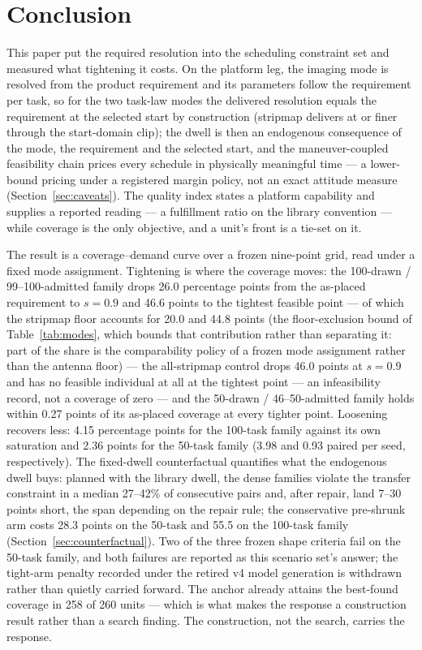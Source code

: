 \documentclass[preprint,authoryear]{elsarticle}
\begin{document}
\section{Conclusion}\label{sec:conclusion}

This paper put the required resolution into the scheduling constraint set and measured what tightening it costs. On the platform leg, the imaging mode is resolved from the product requirement and its parameters follow the requirement per task, so for the two task-law modes the delivered resolution equals the requirement at the selected start by construction (stripmap delivers at or finer through the start-domain clip); the dwell is then an endogenous consequence of the mode, the requirement and the selected start, and the maneuver-coupled feasibility chain prices every schedule in physically meaningful time --- a lower-bound pricing under a registered margin policy, not an exact attitude measure (Section~\ref{sec:caveats}). The quality index states a platform capability and supplies a reported reading --- a fulfillment ratio on the library convention --- while coverage is the only objective, and a unit's front is a tie-set on it.

The result is a coverage--demand curve over a frozen nine-point grid, read under a fixed mode assignment. Tightening is where the coverage moves: the 100-drawn / 99--100-admitted family drops 26.0 percentage points from the as-placed requirement to $s=0.9$ and 46.6 points to the tightest feasible point --- of which the stripmap floor accounts for 20.0 and 44.8 points (the floor-exclusion bound of Table~\ref{tab:modes}, which bounds that contribution rather than separating it: part of the share is the comparability policy of a frozen mode assignment rather than the antenna floor) --- the all-stripmap control drops 46.0 points at $s=0.9$ and has no feasible individual at all at the tightest point --- an infeasibility record, not a coverage of zero --- and the 50-drawn / 46--50-admitted family holds within 0.27 points of its as-placed coverage at every tighter point. Loosening recovers less: 4.15 percentage points for the 100-task family against its own saturation and 2.36 points for the 50-task family (3.98 and 0.93 paired per seed, respectively). The fixed-dwell counterfactual quantifies what the endogenous dwell buys: planned with the library dwell, the dense families violate the transfer constraint in a median 27--42\% of consecutive pairs and, after repair, land 7--30 points short, the span depending on the repair rule; the conservative pre-shrunk arm costs 28.3 points on the 50-task and 55.5 on the 100-task family (Section~\ref{sec:counterfactual}). Two of the three frozen shape criteria fail on the 50-task family, and both failures are reported as this scenario set's answer; the tight-arm penalty recorded under the retired v4 model generation is withdrawn rather than quietly carried forward. The anchor already attains the best-found coverage in 258 of 260 units --- which is what makes the response a construction result rather than a search finding. The construction, not the search, carries the response.
\end{document}
